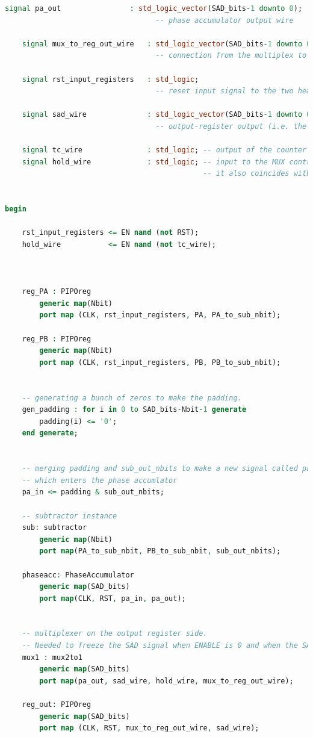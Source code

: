 \documentclass[12pt, a4paper]{article}
\begin{document}
\begin{appendices}
\begin{lstlisting}[language=vhdl]
	signal pa_out                : std_logic_vector(SAD_bits-1 downto 0); 
                                   -- phase accumulator output wire
	
	signal mux_to_reg_out_wire   : std_logic_vector(SAD_bits-1 downto 0);
                                   -- connection from the multiplex to the output PIPO register
	
	signal rst_input_registers   : std_logic;
                                   -- reset input signal to the two heading PIPO registers

	signal sad_wire              : std_logic_vector(SAD_bits-1 downto 0); 
                                   -- output-register output (i.e. the actual SAD signal)
	
	signal tc_wire               : std_logic; -- output of the counter
	signal hold_wire             : std_logic; -- input to the MUX control signal. 
	                                          -- it also coincides with DATA_VALID


begin
		
	rst_input_registers <= EN nand (not RST);
	hold_wire           <= EN nand (not tc_wire);



	reg_PA : PIPOreg
		generic map(Nbit)
		port map (CLK, rst_input_registers, PA, PA_to_sub_nbit);

	reg_PB : PIPOreg
		generic map(Nbit)
		port map (CLK, rst_input_registers, PB, PB_to_sub_nbit);


	-- generating a bunch of zeros to make the padding.
	gen_padding : for i in 0 to SAD_bits-Nbit-1 generate
		padding(i) <= '0';
	end generate;


	-- merging padding and sub_out_nbits to make a new signal called pa_in
	-- which enters the phase accumlator
	pa_in <= padding & sub_out_nbits;

	-- subtractor instance
	sub: subtractor
		generic map(Nbit)
		port map(PA_to_sub_nbit, PB_to_sub_nbit, sub_out_nbits);

	phaseacc: PhaseAccumulator
		generic map(SAD_bits)
		port map(CLK, RST, pa_in, pa_out);


	-- multiplexer on the output register side. 
	-- Needed to freeze the SAD signal when ENABLE is 0 and when the SAD computation is completed.
	mux1 : mux2to1
		generic map(SAD_bits)
		port map(pa_out, sad_wire, hold_wire, mux_to_reg_out_wire);

	reg_out: PIPOreg
		generic map(SAD_bits)
		port map (CLK, RST, mux_to_reg_out_wire, sad_wire);



\end{lstlisting}
\end{appendices}
\end{document}
